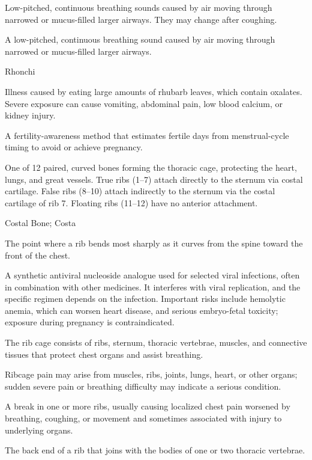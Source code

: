  Low-pitched, continuous breathing sounds caused by air moving through narrowed or mucus-filled larger airways. They may change after coughing.

 A low-pitched, continuous breathing sound caused by air moving through narrowed or mucus-filled larger airways.

\synonyms
Rhonchi

 Illness caused by eating large amounts of rhubarb leaves, which contain oxalates. Severe exposure can cause vomiting, abdominal pain, low blood calcium, or kidney injury.

 A fertility-awareness method that estimates fertile days from menstrual-cycle timing to avoid or achieve pregnancy.

 One of 12 paired, curved bones forming the thoracic cage, protecting the heart, lungs,
and great vessels. True ribs (1--7) attach directly to the sternum via costal cartilage.
False ribs (8--10) attach indirectly to the sternum via the costal cartilage of rib 7.
Floating ribs (11--12) have no anterior attachment.

\synonyms
Costal Bone; Costa

 The point where a rib bends most sharply as it curves from the spine toward the front of the chest.

 A synthetic antiviral nucleoside analogue used for selected viral infections, often in
combination with other medicines. It interferes with viral replication, and the specific regimen depends
on the infection. Important risks include hemolytic anemia, which can worsen heart disease, and serious
embryo-fetal toxicity; exposure during pregnancy is contraindicated.

 The rib cage consists of ribs, sternum, thoracic vertebrae, muscles, and connective tissues that protect chest organs and assist breathing.

 Ribcage pain may arise from muscles, ribs, joints, lungs, heart, or other organs; sudden severe pain or breathing difficulty may indicate a serious condition.

 A break in one or more ribs, usually causing localized chest pain worsened by breathing, coughing, or movement and sometimes associated with injury to underlying organs.

 The back end of a rib that joins with the bodies of one or two thoracic vertebrae.

